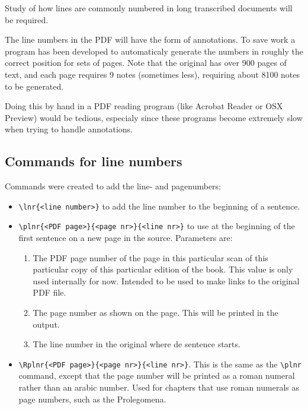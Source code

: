 \documentclass{report}
\begin{document}
Study of how lines are commonly numbered in long transcribed documents
will be required.

The line numbers in the PDF will have the form of annotations. To save work
a program has been developed to automaticaly generate the numbers in roughly
the correct position for sets of pages. Note that the original has over 900
pages of text, and each page requires 9 notes (sometimes less), requiring
about 8100 notes to be generated.

Doing this by hand in a PDF reading program (like Acrobat Reader or OSX Preview)
would be tedious, especialy since these programs become extremely slow when
trying to handle annotations.

\subsection{Commands for line numbers}
Commands were created to add the line- and pagenumbers:
\begin{itemize}
\item \verb+\lnr{<line number>}+ to add the line number to the beginning of
a sentence.
\item \verb+\plnr{<PDF page>}{<page nr>}{<line nr>}+ to use at the beginning of the first sentence on a new page in the source. Parameters are:
\begin{enumerate}
\item The PDF page number of the page in this particular scan of this particular
copy of this particular edition of the book.
This value is only used internally for now. Intended to be used to
make links to the original PDF file.
\item The page number as shown on the page. This will be printed in the output.
\item The line number in the original where de sentence starts.
\end{enumerate}
\item \verb+\Rplnr{<PDF page>}{<page nr>}{<line nr>}+. This is the same as the
 \verb+\plnr+ command, except that the page number will be printed as a roman
 numeral rather than an arabic number. Used for chapters that use roman numerals
 as page numbers, such as the Prolegomena.
\end{itemize}

\end{document}
